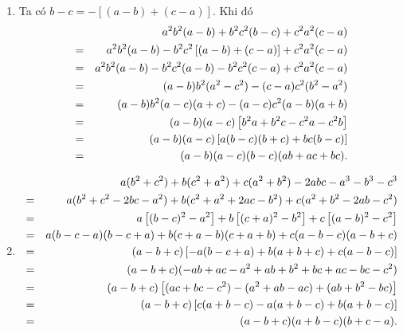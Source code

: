 \begin{bt}
{\begin{enumerate}
\begin{eqnarray*}
		&= &(a-b)(b-c)^3-3b(b-c)(a-b)(a-c)-(b-c)(a-b)^3\notag\\
		&= &(a-b)(b-c)\left[(b-c)^2-3b(a-c)-(a-b)^2\right]\notag\\
		&= &(a-b)(b-c)\left[b^2-2bc+c^2-3ab+3bc-a^2+2ab-b^2\right]\notag\\
		&= &(a-b)(b-c)\left[-2bc+c^2-3ab+3bc-a^2+2ab\right]\notag\\
		&= &(a-b)(b-c)\left[(c^2-a^2)-(2bc-2ab)+(3bc-3ab)\right]\notag\\
		&= &(a-b)(b-c)\left[(c-a)(c+a)-2b(c-a)+3b(c-a)\right]\notag\\
		&= &(a-b)(b-c)(c-a)(c+a-2b+3b)\notag\\
		&= &(a-b)(b-c)(c-a)(a+b+c).\notag
	\end{eqnarray*}
	
	\item 
	Ta có $b-c=-\left[(a-b)+(c-a)\right]$. Khi đó
	\allowdisplaybreaks
	\begin{eqnarray*}
		&	&a^2b^2(a-b)+b^2c^2(b-c)+c^2a^2(c-a)\notag\\
		&= &a^2b^2(a-b)-b^2c^2\left[(a-b)+(c-a)\right]+c^2a^2(c-a)\notag\\
		&= &a^2b^2(a-b)-b^2c^2(a-b)-b^2c^2(c-a)+c^2a^2(c-a)\notag\\
		&= &(a-b)b^2(a^2-c^2)-(c-a)c^2(b^2-a^2)\notag\\
		&= &(a-b)b^2(a-c)(a+c)-(a-c)c^2(a-b)(a+b)\notag\\
		&= &(a-b)(a-c)\left[b^2a+b^2c-c^2a-c^2b\right]\notag\\
		&= &(a-b)(a-c)\left[a(b-c)(b+c)+bc(b-c)\right]\notag\\
		&= &(a-b)(a-c)(b-c)(ab+ac+bc).\notag
	\end{eqnarray*}
	
	\item \allowdisplaybreaks
	\begin{eqnarray*}
		&	&a(b^2+c^2)+b(c^2+a^2)+c(a^2+b^2)-2abc-a^3-b^3-c^3\notag\\
		&= &a(b^2+c^2-2bc-a^2)+b(c^2+a^2+2ac-b^2)+c(a^2+b^2-2ab-c^2)\notag\\
		&= &a\left[(b-c)^2-a^2\right]+b\left[(c+a)^2-b^2\right]+c\left[(a-b)^2-c^2\right]\notag\\
		&= &a(b-c-a)(b-c+a)+b(c+a-b)(c+a+b)+c(a-b-c)(a-b+c)\notag\\
		&= &(a-b+c)\left[-a(b-c+a)+b(a+b+c)+c(a-b-c)\right]\notag\\
		&= &(a-b+c)(-ab+ac-a^2+ab+b^2+bc+ac-bc-c^2)\notag\\
		&= &(a-b+c)\left[(ac+bc-c^2)-(a^2+ab-ac)+(ab+b^2-bc)\right]\notag\\
		&= &(a-b+c)\left[c(a+b-c)-a(a+b-c)+b(a+b-c)\right]\notag\\
		&= &(a-b+c)(a+b-c)(b+c-a).\notag
	\end{eqnarray*}
	

\end{enumerate}}
\end{bt}
